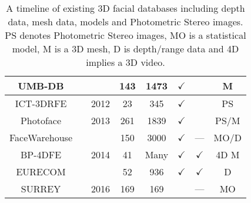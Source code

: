 \begin{table}[]
{\begin{tabular}{@{}cccccccc@{}}
UMB-DB                      &\cite{colombo2011umb}          &                       & 143         & 1473        & $\checkmark$ &              & M      \\ \midrule
ICT-3DRFE                   &\cite{stratou2012exploring}    & 2012                  & 23          & 345         & $\checkmark$ &              & PS     \\ \midrule
Photoface                   &\cite{RefWorks:293}            & 2013                  & 261         & 1839        & $\checkmark$ &              & PS/M   \\ \midrule
FaceWarehouse               &\cite{Cao:2014gy}              & \multirow{3}{*}{2014} & 150         & 3000        & $\checkmark$ & ---          & MO/D   \\
BP-4DFE                     &\cite{Zhang:2014id}            &                       & 41          & Many        & $\checkmark$ & $\checkmark$ & 4D M   \\
EURECOM                     &\cite{min2014kinectfacedb}     &                       & 52          & 936         & $\checkmark$ & $\checkmark$ & D      \\ \midrule
SURREY                      &\cite{Huber:F5Dca9zy}          & 2016                  & 169         & 169         &              & ---          & MO     \\ \bottomrule
\end{tabular}%
}
\caption{A timeline of existing 3D facial databases including depth data, mesh
         data, models and Photometric Stereo images. PS denotes Photometric
         Stereo images, MO is a statistical model, M is a 3D mesh, 
         D is depth/range data and 4D implies a 3D video.}
\label{tbl:timeline_db}
\end{table}
